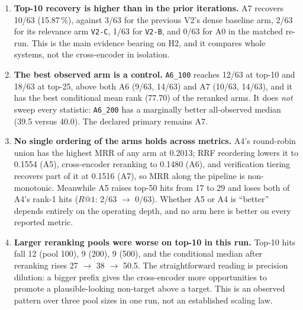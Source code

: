 \documentclass[11pt,a4paper]{article}
\begin{document}
\begin{enumerate}
\item \textbf{Top-10 recovery is higher than in the prior iterations.} A7 recovers 10/63 (15.87\,\%), against
3/63 for the previous V2's dense baseline arm, 2/63 for its relevance arm \texttt{V2-C}, 1/63 for
\texttt{V2-B}, and 0/63 for A0 in the matched re-run. This is the main evidence bearing on H2, and it
compares whole systems, not the cross-encoder in isolation.

\item \textbf{The best observed arm is a control.} \texttt{A6\_100} reaches 12/63 at top-10 and 18/63 at
top-25, above both A6 (9/63, 14/63) and A7 (10/63, 14/63), and it has the best conditional mean rank (77.70)
of the reranked arms. It does \emph{not} sweep every statistic: \texttt{A6\_200} has a marginally better
all-observed median (39.5 versus 40.0). The declared primary remains A7.

\item \textbf{No single ordering of the arms holds across metrics.} A4's round-robin union has the highest
MRR of any arm at 0.2013; RRF reordering lowers it to 0.1554 (A5), cross-encoder reranking to 0.1480 (A6),
and verification tiering recovers part of it at 0.1516 (A7), so MRR along the pipeline is non-monotonic.
Meanwhile A5 raises top-50 hits from 17 to 29 and loses both of A4's rank-1 hits ($R@1$: 2/63 $\to$ 0/63).
Whether A5 or A4 is ``better'' depends entirely on the operating depth, and no arm here is better on every
reported metric.

\item \textbf{Larger reranking pools were worse on top-10 in this run.} Top-10 hits fall 12 (pool 100), 9
(200), 9 (500), and the conditional median after reranking rises 27 $\to$ 38 $\to$ 50.5. The straightforward
reading is precision dilution: a bigger prefix gives the cross-encoder more opportunities to promote a
plausible-looking non-target above a target. This is an observed pattern over three pool sizes in one run,
not an established scaling law.
\end{enumerate}
\end{document}
